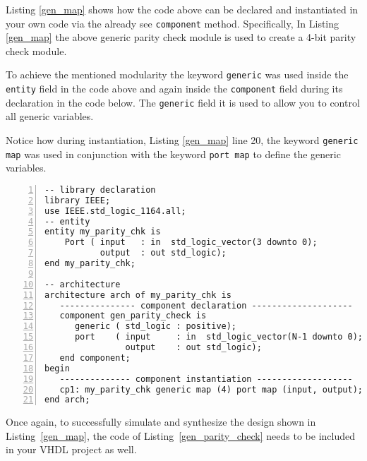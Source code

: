 Listing \ref{gen_map} shows how the code above can be declared and instantiated in your own code via the already see \texttt{component} method. Specifically, In Listing \ref{gen_map} the above generic parity check module is used to create a 4-bit parity check module.

To achieve the mentioned modularity the keyword \texttt{generic} was used inside the \texttt{entity} field in the code above and again inside the \texttt{component} field during its declaration in the code below. The \texttt{generic} field it is used to allow you to control all generic variables.

Notice how during instantiation, Listing \ref{gen_map} line 20, the keyword \texttt{generic map} was used in conjunction with the keyword \texttt{port map} to define the generic variables.

\noindent
\begin{minipage}{0.99\linewidth}
\begin{lstlisting}[numbers=left, label=gen_map, caption=Use of \texttt{generic} for the construct of a generic parity check code.]
-- library declaration
library IEEE;
use IEEE.std_logic_1164.all;
-- entity
entity my_parity_chk is
    Port ( input   : in  std_logic_vector(3 downto 0);
           output  : out std_logic);
end my_parity_chk;

-- architecture
architecture arch of my_parity_chk is 
   --------------- component declaration --------------------
   component gen_parity_check is
      generic ( std_logic : positive);
      port    ( input     : in  std_logic_vector(N-1 downto 0);
                output    : out std_logic);
   end component;
begin
   -------------- component instantiation -------------------
   cp1: my_parity_chk generic map (4) port map (input, output);
end arch;

\end{lstlisting}
\end{minipage}

Once again, to successfully simulate and synthesize the design shown in Listing~\ref{gen_map}, the code of Listing~\ref{gen_parity_check} needs to be included in your VHDL project as well.

